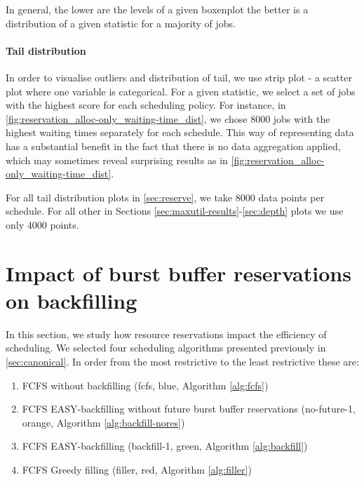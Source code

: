 \documentclass[thesis-en.tex]{subfiles}
\begin{document}
In general, the lower are the levels of a given boxenplot the better is a distribution of a given statistic for a majority of jobs.

\paragraph{Tail distribution}
In order to visualise outliers and distribution of tail, we use strip plot - a scatter plot where one variable is categorical. For a given statistic, we select a set of jobs with the highest score for each scheduling policy. For instance, in \autoref{fig:reservation_alloc-only_waiting-time_dist}, we chose $8000$ jobs with the highest waiting times separately for each schedule. This way of representing data has a substantial benefit in the fact that there is no data aggregation applied, which may sometimes reveal surprising results as in \autoref{fig:reservation_alloc-only_waiting-time_dist}.

For all tail distribution plots in \autoref{sec:reserve}, we take $8000$ data points per schedule. For all other in Sections \ref{sec:maxutil-results}-\ref{sec:depth} plots we use only $4000$ points.

\section{Impact of burst buffer reservations on backfilling} \label{sec:reserve}
In this section, we study how resource reservations impact the efficiency of scheduling. We selected four scheduling algorithms presented previously in \autoref{sec:canonical}. In order from the most restrictive to the least restrictive these are:
\begin{enumerate}
    \item FCFS without backfilling (fcfs, blue, Algorithm \ref{alg:fcfs})
    \item FCFS EASY-backfilling without future burst buffer reservations (no-future-1, orange, Algorithm \ref{alg:backfill-nores})
    \item FCFS EASY-backfilling (backfill-1, green, Algorithm \ref{alg:backfill})
    \item FCFS Greedy filling (filler, red, Algorithm \ref{alg:filler})
\end{enumerate}
\end{document}
